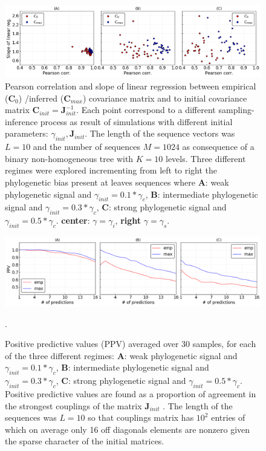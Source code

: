 \documentclass[preprint,amsmath,amssymb,superscriptaddress,showpacs,pre]{revtex4-1}
\begin{document}
\begin{figure}[!htb]
	\includegraphics[keepaspectratio=true,width=1.0\textwidth]{Figures/covariance_panel_pearson_corr_vs_lin_reg_slope_L10_M1024_same_range.png}
	\vspace{-1mm}
\caption{{  Pearson correlation and  slope of linear regression between empirical ($\bm C_{0}$) /inferred ($\bm C_{max}$) covariance  matrix and to  initial covariance matrix $\bm C_{init}=\bm J^{-1}_{init}$.  Each point correspond to a different sampling-inference process as result of simulations with different initial parameters: $\gamma_{init},\bm J_{init}$. The length of the sequence vectors was $L=10$ and the number of sequences  $M=1024$ as consequence of a binary non-homogeneous tree with $K=10$ levels. Three different regimes were explored incrementing from left to right the  phylogenetic bias present at leaves sequences where \textbf{A}: weak phylogenetic signal and   $\gamma_{init}=0.1*\gamma_c$, \textbf{B}: intermediate phylogenetic signal  and $\gamma_{init}=0.3*\gamma_c$, \textbf{C}: strong phylogenetic signal and $\gamma_{init}=0.5*\gamma_c$.    \textbf{center}: $\gamma=\gamma_i$, \textbf{right} $\gamma=\gamma_s$.  }} 
\label{results_corr_map_C_10_n10}
\end{figure}		


\begin{figure}[!htb]
	\includegraphics[keepaspectratio=true,width=1.0\textwidth]{Figures/PPV_panel_L10_M1024.png}
	\vspace{-1mm}
\caption{{  Positive predictive values (PPV) averaged over 30 samples,  for each of the three different regimes: \textbf{A}: weak phylogenetic signal and   $\gamma_{init}=0.1*\gamma_c$, \textbf{B}: intermediate phylogenetic signal  and $\gamma_{init}=0.3*\gamma_c$, \textbf{C}: strong phylogenetic signal and $\gamma_{init}=0.5*\gamma_c$.  Positive predictive values are found as a proportion of agreement in the strongest couplings of the matrix $\bm J_{init}$ . The length of the sequences was $L=10$ so that couplings matrix has $10^2$ entries of which on average only 16 off diagonals elements  are nonzero  given the sparse character of the initial matrices. }} .
\label{PPV_n10}
\end{figure}		
\end{document}
